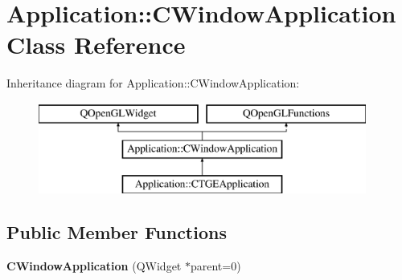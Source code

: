 \hypertarget{class_application_1_1_c_window_application}{}\section{Application\+::C\+Window\+Application Class Reference}
\label{class_application_1_1_c_window_application}
Inheritance diagram for Application\+::C\+Window\+Application\+:\begin{figure}[H]
\begin{center}
\leavevmode
\includegraphics[height=3.000000cm]{class_application_1_1_c_window_application}
\end{center}
\end{figure}
\subsection*{Public Member Functions}
\begin{DoxyCompactItemize}
\item 
\mbox{\label{class_application_1_1_c_window_application_a775481d2b9afc278497148dae98ba44c}} 
{\bfseries C\+Window\+Application} (Q\+Widget $\ast$parent=0)
\end{DoxyCompactItemize}
